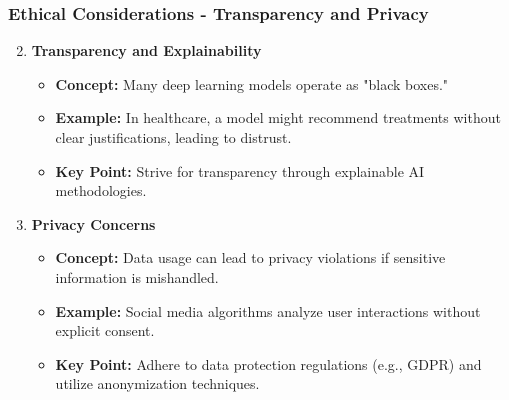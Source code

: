 \documentclass[aspectratio=169]{beamer}
\begin{document}
\begin{frame}[fragile]
    \frametitle{Ethical Considerations - Transparency and Privacy}
    \begin{enumerate}
        \setcounter{enumi}{1}
        \item \textbf{Transparency and Explainability}
        \begin{itemize}
            \item \textbf{Concept:} Many deep learning models operate as "black boxes."
            \item \textbf{Example:} In healthcare, a model might recommend treatments without clear justifications, leading to distrust.
            \item \textbf{Key Point:} Strive for transparency through explainable AI methodologies.
        \end{itemize}

        \item \textbf{Privacy Concerns}
        \begin{itemize}
            \item \textbf{Concept:} Data usage can lead to privacy violations if sensitive information is mishandled.
            \item \textbf{Example:} Social media algorithms analyze user interactions without explicit consent.
            \item \textbf{Key Point:} Adhere to data protection regulations (e.g., GDPR) and utilize anonymization techniques.
        \end{itemize}
    \end{enumerate}
\end{frame}
\end{document}
